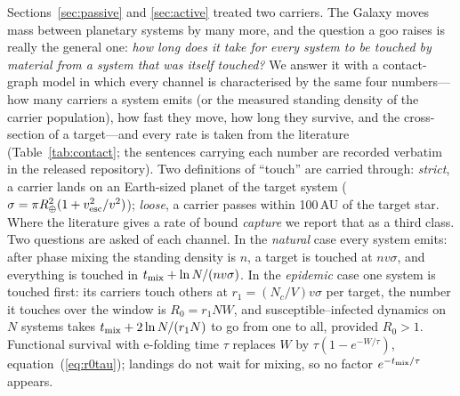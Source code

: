\documentclass[11pt]{article}
\begin{document}
Sections~\ref{sec:passive} and \ref{sec:active} treated two carriers.  The
Galaxy moves mass between planetary systems by many more, and the question a
goo raises is really the general one: \emph{how long does it take for every
system to be touched by material from a system that was itself touched?}  We
answer it with a contact-graph model in which every channel is characterised
by the same four numbers---how many carriers a system emits (or the measured
standing density of the carrier population), how fast they move, how long they
survive, and the cross-section of a target---and every rate is taken from the
literature (Table~\ref{tab:contact}; the sentences carrying each number are
recorded verbatim in the released repository).  Two definitions of ``touch''
are carried through: \emph{strict}, a carrier lands on an Earth-sized planet of
the target system ($\sigma=\pi R_\oplus^{2}(1+v_{\rm esc}^{2}/v^{2})$);
\emph{loose}, a carrier passes within 100\,AU of the target star.  Where the
literature gives a rate of bound \emph{capture} we report that as a third
class.  Two questions are asked of each channel.  In the \emph{natural} case
every system emits: after phase mixing the standing density is $n$, a target is
touched at $n v\sigma$, and everything is touched in $t_{\rm mix}+\ln
N/(nv\sigma)$.  In the \emph{epidemic} case one system is touched first: its
carriers touch others at $r_{1}=(N_{c}/V)v\sigma$ per target, the number it
touches over the window is $R_{0}=r_{1}N W$, and susceptible--infected
dynamics on $N$ systems takes $t_{\rm mix}+2\ln N/(r_{1}N)$ to go from one to
all, provided $R_{0}>1$.  Functional survival with e-folding time $\tau$
replaces $W$ by $\tau(1-e^{-W/\tau})$, equation~(\ref{eq:r0tau}); landings do
not wait for mixing, so no factor $e^{-t_{\rm mix}/\tau}$ appears.
\end{document}
